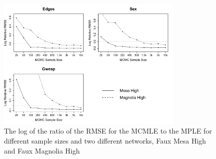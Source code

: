 \documentclass[10pt, conference, compsocconf]{IEEEtran}
\begin{document}


\begin{figure}
\centering
\includegraphics[width=9cm]{RMSE_10k} 
\caption{The log of the ratio of the RMSE for the MCMLE to the MPLE for different sample sizes and two different networks, Faux Mesa High and Faux Magnolia High} 
\label{rmse}
\vspace{-.5cm}
\end{figure}
\end{document}
